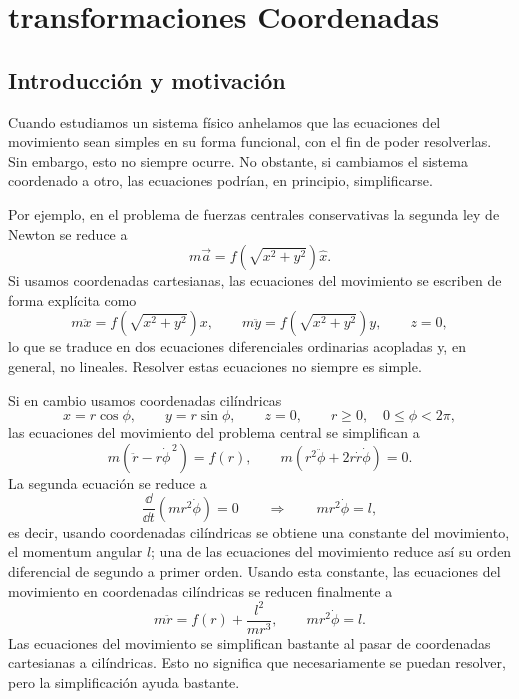 \chapter{transformaciones Coordenadas}

\section{Introducción y motivación}

Cuando estudiamos un sistema físico anhelamos que las ecuaciones del movimiento sean simples en su forma funcional, con el fin de poder resolverlas. Sin embargo, esto no siempre ocurre. No obstante, si cambiamos el sistema coordenado a otro, las ecuaciones podrían, en principio, simplificarse.

Por ejemplo, en el problema de fuerzas centrales conservativas la segunda ley de Newton se reduce a
\begin{equation}
m\vec a = f\!\left(\sqrt{x^2+y^2}\right)\hat x .
\end{equation}
Si usamos coordenadas cartesianas, las ecuaciones del movimiento se escriben de forma explícita como
\begin{equation}
m\ddot x = f\!\left(\sqrt{x^2+y^2}\right)x, \qquad
m\ddot y = f\!\left(\sqrt{x^2+y^2}\right)y, \qquad
z=0,
\end{equation}
lo que se traduce en dos ecuaciones diferenciales ordinarias acopladas y, en general, no lineales. Resolver estas ecuaciones no siempre es simple.

Si en cambio usamos coordenadas cilíndricas
\begin{equation}
x = r\cos\phi, \qquad y = r\sin\phi, \qquad z = 0, \qquad r\ge 0,\quad 0\le \phi < 2\pi,
\end{equation}
las ecuaciones del movimiento del problema central se simplifican a
\begin{equation}
m\!\left(\ddot r - r\dot\phi^{\,2}\right) = f(r), \qquad
m\!\left(r^2\ddot\phi + 2r\dot r\dot\phi\right) = 0 .
\end{equation}
La segunda ecuación se reduce a
\begin{equation}
\frac{\dd}{\dd t}\!\left(mr^2\dot\phi\right) = 0
\qquad\Longrightarrow\qquad
mr^2\dot\phi = l,
\end{equation}
es decir, usando coordenadas cilíndricas se obtiene una constante del movimiento, el momentum angular $l$; una de las ecuaciones del movimiento reduce así su orden diferencial de segundo a primer orden. Usando esta constante, las ecuaciones del movimiento en coordenadas cilíndricas se reducen finalmente a
\begin{equation}
m\ddot r = f(r) + \frac{l^2}{mr^3}, \qquad mr^2\dot\phi = l .
\end{equation}
Las ecuaciones del movimiento se simplifican bastante al pasar de coordenadas cartesianas a cilíndricas. Esto no significa que necesariamente se puedan resolver, pero la simplificación ayuda bastante.

